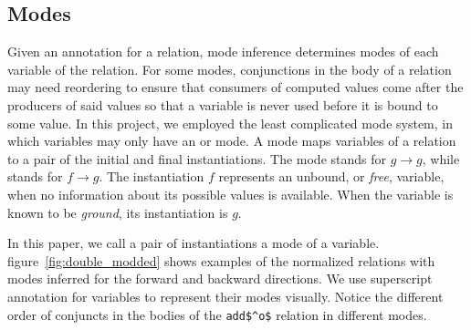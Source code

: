 \label{sec:mode}
\subsection{Modes}


Given an annotation for a relation, mode inference determines modes of each variable of the relation.
For some modes, conjunctions in the body of a relation may need reordering to ensure that consumers of computed values come after the producers of said values so that a variable is never used before it is bound to some value.
In this project, we employed the least complicated mode system, in which variables may only have an \inm or \outm mode.
A mode maps variables of a relation to a pair of the initial and final instantiations.
The mode \inm stands for $g \rightarrow g$, while \outm stands for $f \rightarrow g$.
The instantiation $f$ represents an unbound, or \emph{free}, variable, when no information about its possible values is available.
When the variable is known to be \emph{ground}, its instantiation is $g$.

In this paper, we call a pair of instantiations a mode of a variable.
figure~\ref{fig:double_modded} shows examples of the normalized \mk relations with modes inferred for the forward and backward directions.
We use superscript annotation for variables to represent their modes visually.
Notice the different order of conjuncts in the bodies of the \lstinline{add$^o$} relation in different modes.




